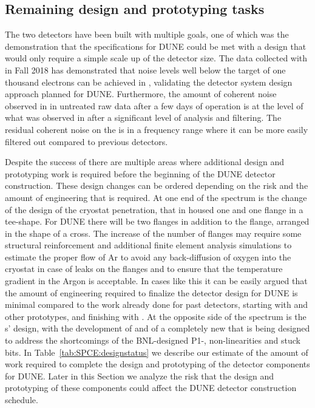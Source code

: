 \subsection{Remaining design and prototyping tasks}
\label{sec:fdsp-tpcelec-overview-remaining}

The two  detectors have been built with multiple
goals, one of which was the demonstration that the specifications
for DUNE could be met with a design that would only require a simple
scale up of the detector size. The data collected with 
in Fall 2018 has demonstrated that noise levels well below the target
of one thousand electrons can be achieved in \lar, validating the
detector system design approach planned for DUNE. Furthermore, the amount
of coherent noise observed in  in untreated raw data
after a few days of operation is at the level of what was observed
in  after a significant level of analysis and
filtering. The residual coherent noise on the  is in
a frequency range where it can be more easily filtered out compared 
to previous \lar detectors.

Despite the success of  there are multiple areas where
additional design and prototyping work is required before the
beginning of the DUNE detector construction. These design changes
can be ordered depending on the risk and the amount of engineering
that is required. At one end of the spectrum is the change of the
design of the cryostat penetration, that in  housed one
 and one  flange in a tee-shape. For DUNE
there will be two  flanges in addition to the 
flange, arranged in the shape of a cross. The increase of the number
of flanges may require some structural reinforcement and additional
finite element analysis simulations to estimate the proper flow of
Ar to avoid any back-diffusion of oxygen into the cryostat in case
of leaks on the flanges and to ensure that the temperature gradient
in the Argon is acceptable. In cases like this it can be easily
argued that the amount of engineering required to finalize the
detector design for DUNE is minimal compared to the work already
done for past \lar detectors, starting with \microboone and
other prototypes, and finishing with . At the opposite
side of the spectrum is the s' design, with the
development of  and of a completely new 
that is being designed to address the shortcomings of the BNL-designed
P1-, non-linearities and stuck bits. In Table~\ref{tab:SPCE:designstatus}
we describe our estimate of the amount of work required to complete
the design and prototyping of the  detector components for
DUNE. Later in this Section we analyze the risk that the design
and prototyping of these components could affect the DUNE detector
construction schedule.

